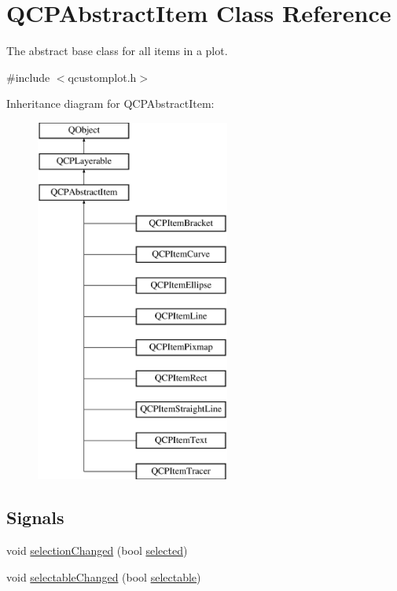 \hypertarget{class_q_c_p_abstract_item}{}\section{Q\+C\+P\+Abstract\+Item Class Reference}
\label{class_q_c_p_abstract_item}


The abstract base class for all items in a plot.  




{\ttfamily \#include $<$qcustomplot.\+h$>$}

Inheritance diagram for Q\+C\+P\+Abstract\+Item\+:\begin{figure}[H]
\begin{center}
\leavevmode
\includegraphics[height=12.000000cm]{da/d6a/class_q_c_p_abstract_item}
\end{center}
\end{figure}
\subsection*{Signals}
\begin{DoxyCompactItemize}
\item 
void \mbox{\hyperlink{class_q_c_p_abstract_item_aa5cffb034fc65dbb91c77e02c1c14251}{selection\+Changed}} (bool \mbox{\hyperlink{class_q_c_p_abstract_item_aa069fba320a13639f119f82ad29ead96}{selected}})
\item 
void \mbox{\hyperlink{class_q_c_p_abstract_item_a5b266c11aac61cb511901f3911dac2a3}{selectable\+Changed}} (bool \mbox{\hyperlink{class_q_c_p_abstract_item_ae29aa489767352b40c4aaa7ea50c5582}{selectable}})
\end{DoxyCompactItemize}
